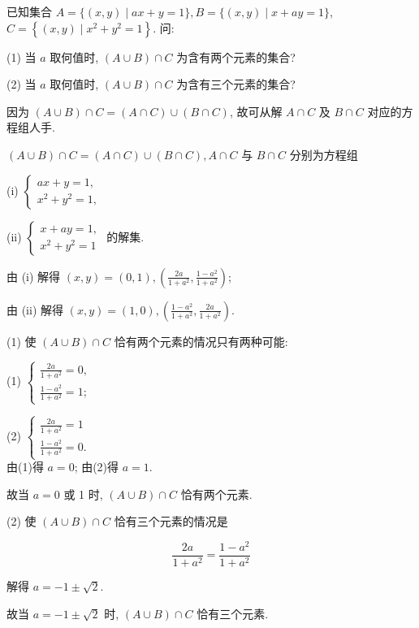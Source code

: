 \begin{example}
已知集合 $A=\{(x, y) \mid a x+y=1\}, B=\{(x, y) \mid x+a y=1\}$, $C=\left\{(x, y) \mid x^{2}+y^{2}=1\right\}$. 问:

(1) 当 $a$ 取何值时, $(A \cup B) \cap C$ 为含有两个元素的集合?

(2) 当 $a$ 取何值时, $(A \cup B) \cap C$ 为含有三个元素的集合?

\end{example}

\begin{analysis}
因为 $(A \cup B) \cap C=(A \cap C) \cup(B \cap C)$, 故可从解 $A \cap C$ 及 $B \cap C$ 对应的方程组人手.
\end{analysis}

\begin{solution}
$(A \cup B) \cap C=(A \cap C) \cup(B \cap C), A \cap C$ 与 $B \cap C$ 分别为方程组

(i) $\left\{\begin{array}{l}a x+y=1, \\ x^{2}+y^{2}=1,\end{array}\right.$

(ii) $\left\{\begin{array}{l}x+a y=1, \\ x^{2}+y^{2}=1\end{array}\right.$
的解集.

由 (i) 解得 $(x, y)=(0,1),\left(\frac{2 a}{1+a^{2}}, \frac{1-a^{2}}{1+a^{2}}\right)$;

由 (ii) 解得 $(x, y)=(1,0),\left(\frac{1-a^{2}}{1+a^{2}}, \frac{2 a}{1+a^{2}}\right)$.

(1) 使 $(A \cup B) \cap C$ 恰有两个元素的情况只有两种可能:

(1) $\left\{\begin{array}{l}\frac{2 a}{1+a^{2}}=0, \\ \frac{1-a^{2}}{1+a^{2}}=1 ;\end{array}\right.$

(2) $\left\{\begin{array}{l}\frac{2 a}{1+a^{2}}=1 \\ \frac{1-a^{2}}{1+a^{2}}=0 .\end{array}\right.$\\
由(1)得 $a=0$; 由(2)得 $a=1$.

故当 $a=0$ 或 1 时, $(A \cup B) \cap C$ 恰有两个元素.

(2) 使 $(A \cup B) \cap C$ 恰有三个元素的情况是

$$
\frac{2 a}{1+a^{2}}=\frac{1-a^{2}}{1+a^{2}}
$$

解得 $a=-1 \pm \sqrt{2}$.

故当 $a=-1 \pm \sqrt{2}$ 时, $(A \cup B) \cap C$ 恰有三个元素.
\end{solution}

